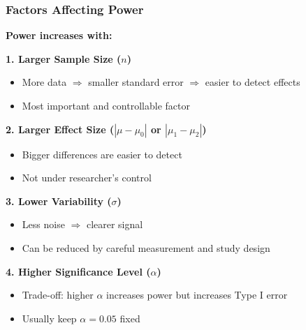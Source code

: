 \documentclass{beamer}
\begin{document}
\begin{frame}
\frametitle{Factors Affecting Power}
\textbf{Power increases with:}

\vspace{0.3cm}
\textbf{1. Larger Sample Size ($n$)}
\begin{itemize}
\item More data $\Rightarrow$ smaller standard error $\Rightarrow$ easier to detect effects
\item Most important and controllable factor
\end{itemize}

\vspace{0.3cm}
\textbf{2. Larger Effect Size ($|\mu - \mu_0|$ or $|\mu_1 - \mu_2|$)}
\begin{itemize}
\item Bigger differences are easier to detect
\item Not under researcher's control
\end{itemize}

\vspace{0.3cm}
\textbf{3. Lower Variability ($\sigma$)}
\begin{itemize}
\item Less noise $\Rightarrow$ clearer signal
\item Can be reduced by careful measurement and study design
\end{itemize}

\vspace{0.3cm}
\textbf{4. Higher Significance Level ($\alpha$)}
\begin{itemize}
\item Trade-off: higher $\alpha$ increases power but increases Type I error
\item Usually keep $\alpha = 0.05$ fixed
\end{itemize}
\end{frame}
\end{document}
